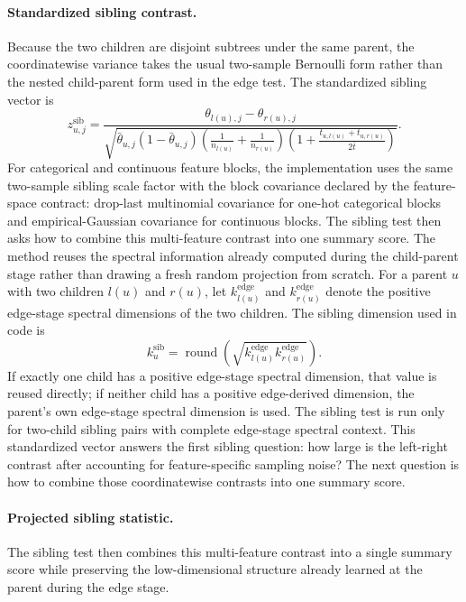 \paragraph{Standardized sibling contrast.}
Because the two children are disjoint subtrees under the same parent, the
coordinatewise variance takes the usual two-sample Bernoulli form rather than
the nested child-parent form used in the edge test. The standardized sibling
vector is
\begin{equation}
z_{u,j}^{\mathrm{sib}}
=
\frac{\theta_{l(u),j} - \theta_{r(u),j}}
{\sqrt{
\bar{\theta}_{u,j}(1-\bar{\theta}_{u,j})
\left(\frac{1}{n_{l(u)}} + \frac{1}{n_{r(u)}}\right)
\left(1+\frac{t_{u,l(u)}+t_{u,r(u)}}{2\bar t}\right)
}}.
\end{equation}
For categorical and continuous feature blocks, the implementation uses the same
two-sample sibling scale factor with the block covariance declared by the
feature-space contract: drop-last multinomial covariance for one-hot
categorical blocks and empirical-Gaussian covariance for continuous blocks.
The sibling test then asks how to combine this multi-feature contrast into one
summary score. The method reuses the spectral information already
computed during the child-parent stage rather than drawing a fresh random
projection from scratch. For a parent $u$ with two children $l(u)$ and
$r(u)$, let $k_{l(u)}^{\mathrm{edge}}$ and $k_{r(u)}^{\mathrm{edge}}$ denote
the positive edge-stage spectral dimensions of the two children. The sibling
dimension used in code is
\begin{equation}
k_u^{\mathrm{sib}}
=
\operatorname{round}
\!\left(
\sqrt{
k_{l(u)}^{\mathrm{edge}}
k_{r(u)}^{\mathrm{edge}}
}
\right).
\end{equation}
If exactly one child has a positive edge-stage spectral dimension, that value
is reused directly; if neither child has a positive edge-derived dimension, the
parent's own edge-stage spectral dimension is used. The sibling test is run only
for two-child sibling pairs with complete edge-stage spectral context. This
standardized vector answers the first sibling question: how large is the
left-right contrast after accounting for feature-specific sampling noise? The
next question is how to combine those coordinatewise contrasts into one summary
score.

\paragraph{Projected sibling statistic.}
The sibling test then combines this multi-feature contrast into a single
summary score while preserving the low-dimensional structure already learned at
the parent during the edge stage.

